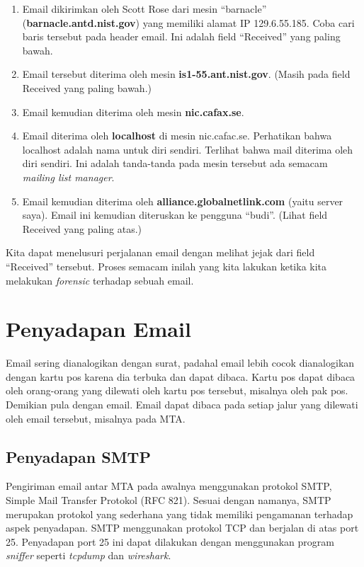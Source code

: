 \begin{enumerate}
   \item Email dikirimkan oleh Scott Rose dari mesin ``barnacle''
      ({\bf barnacle.antd.nist.gov}) yang memiliki alamat IP 129.6.55.185. 
      Coba cari baris tersebut pada header email. Ini adalah field 
      ``Received'' yang paling bawah.
   \item Email tersebut diterima oleh mesin {\bf is1-55.ant.nist.gov}.
      (Masih pada field Received yang paling bawah.)
   \item Email kemudian diterima oleh mesin {\bf nic.cafax.se}.
   \item Email diterima oleh {\bf localhost} di mesin nic.cafac.se. Perhatikan
      bahwa localhost adalah nama untuk diri sendiri. Terlihat bahwa mail
      diterima oleh diri sendiri. Ini adalah tanda-tanda pada mesin tersebut
      ada semacam {\em mailing list manager}. 
   \item Email kemudian diterima oleh {\bf alliance.globalnetlink.com} 
      (yaitu server saya). Email ini kemudian diteruskan ke pengguna 
      ``budi''. (Lihat field Received yang paling atas.)
\end{enumerate}

Kita dapat menelusuri perjalanan email dengan melihat jejak dari field
``Received'' tersebut. Proses semacam inilah yang kita lakukan ketika kita
melakukan {\em forensic} terhadap sebuah email.

\section{Penyadapan Email}
Email sering dianalogikan dengan surat, padahal email lebih cocok dianalogikan
dengan kartu pos karena dia terbuka dan dapat dibaca. Kartu pos dapat dibaca
oleh orang-orang yang dilewati oleh kartu pos tersebut, misalnya oleh pak pos.
Demikian pula dengan email. Email dapat dibaca pada setiap jalur yang dilewati
oleh email tersebut, misalnya pada MTA.

\subsection{Penyadapan SMTP}

Pengiriman email antar MTA pada awalnya menggunakan protokol SMTP, Simple Mail
Transfer Protokol (RFC 821). Sesuai dengan namanya, SMTP merupakan protokol
yang sederhana yang tidak memiliki pengamanan terhadap aspek penyadapan. SMTP
menggunakan protokol TCP dan berjalan di atas port 25. Penyadapan port 25 ini
dapat dilakukan dengan menggunakan program {\em sniffer} seperti {\em tcpdump}
dan {\em wireshark}.

